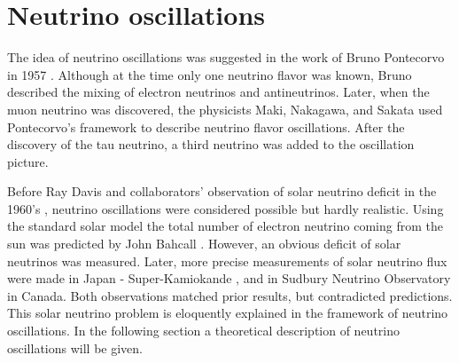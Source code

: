 \section{Neutrino oscillations}
The idea of neutrino oscillations was suggested in the work of Bruno Pontecorvo in 
1957 \cite{pontecorvo}. Although at the time only one neutrino flavor was known, 
Bruno described the mixing of electron neutrinos and antineutrinos. Later, when the muon 
neutrino was discovered, the physicists Maki, Nakagawa, and Sakata used Pontecorvo's 
framework \cite{maki} to describe neutrino flavor oscillations. After the discovery 
of the tau neutrino, a third neutrino was added to the oscillation picture.

Before Ray Davis and collaborators' observation of solar neutrino deficit in the 1960's 
\cite{davis}, neutrino oscillations were considered possible but hardly realistic. 
Using the standard solar model the total number of electron neutrino coming from the sun 
was predicted by John Bahcall \cite{bahcall}. However, an obvious deficit of solar 
neutrinos was measured. Later, more precise measurements of solar neutrino flux were 
made in Japan - Super-Kamiokande \cite{suzuki}, and in Sudbury Neutrino Observatory 
\cite{mcdonald} in Canada. Both observations matched prior results, but contradicted predictions. 
This solar neutrino problem is eloquently explained in the framework of neutrino oscillations. 
In the following section a theoretical description of neutrino oscillations will be given.

